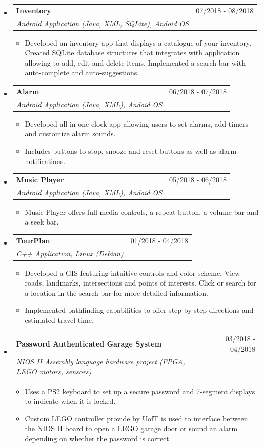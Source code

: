 \documentclass[letterpaper,11pt]{article}
\makeatletter
\newcommand{\resitem}[1]{\item #1 \vspace{-2pt}}
\newcommand{\ressubheading}[4]{
\begin{tabular*}{7.0in}{l@{\extracolsep{\fill}}r}
		\textbf{#1} & #2 \\
		\textit{#3} & \textit{#4} \\
\end{tabular*}\vspace{-6pt}}
\makeatother
\begin{document}
\begin{itemize}
    \item
    \ressubheading{Inventory}{07/2018 - 08/2018}{Android Application (Java, XML, SQLite), Andoid OS}{}
    \begin{itemize}
        \resitem{Developed an inventory app that displays a catalogue of your inventory. Created SQLite database structures that integrates with application allowing to add, edit and delete items. Implemented a search bar with auto-complete and auto-suggestions.}
    \end{itemize}
    
    \item
    \ressubheading{Alarm}{06/2018 - 07/2018}{Android Application (Java, XML), Andoid OS}{}
    \begin{itemize}
        \resitem{Developed all in one clock app allowing users to set alarms, add timers and customize alarm sounds.}
        \resitem{Includes buttons to stop, snooze and reset buttons as well as alarm notifications.}
    \end{itemize}
 
 	\item
    \ressubheading{Music Player}{05/2018 - 06/2018}{Android Application (Java, XML), Andoid OS}{}
    \begin{itemize}
        \resitem{Music Player offers full media controls, a repeat button, a volume bar and a seek bar.}
    \end{itemize}
  
    \item
      \ressubheading{TourPlan}{01/2018 - 04/2018}{C++ Application, Linux (Debian)}{}
      \begin{itemize}
          \resitem{Developed a GIS featuring intuitive controls and color scheme. View roads, landmarks, intersections and points of interests. Click or search for a location in the search bar for more detailed information.}
          \resitem{Implemented pathfinding capabilities to offer step-by-step directions and estimated travel time.}
      \end{itemize}
      
    \item
      \ressubheading{Password Authenticated Garage System}{03/2018 - 04/2018}		{NIOS II Assembly language hardware project (FPGA, LEGO motors, sensors)}{}
      \begin{itemize}
          \resitem{Uses a PS2 keyboard to set up a secure password and 7-segment displays to indicate when it is locked.}
          \resitem{Custom LEGO controller provide by UofT is used to interface between the NIOS II board to open a LEGO garage door or sound an alarm depending on whether the password is correct.}
      \end{itemize}  
  

\end{itemize}
\end{document}
